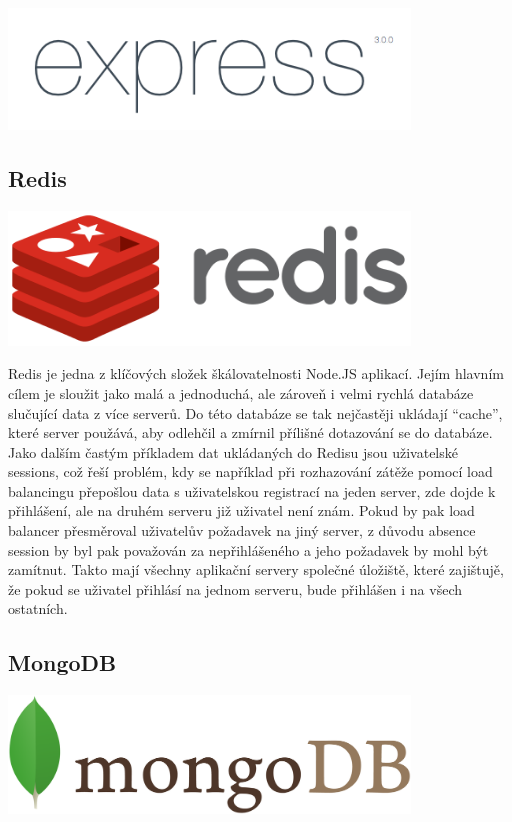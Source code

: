 \documentclass[thesis=M,czech]{FITthesis}[2012/06/26]
\begin{document}
\includegraphics[width=0.8\textwidth]{images/logo_express}


\subsection{Redis}

\includegraphics[width=0.8\textwidth]{images/logo_redis}

Redis je jedna z klíčových složek škálovatelnosti Node.JS aplikací. Jejím hlavním cílem je sloužit jako malá a jednoduchá, ale zároveň i velmi rychlá databáze slučující data z více serverů. Do této databáze se tak nejčastěji ukládají “cache”, které server použává, aby odlehčil a zmírnil přílišné dotazování se do databáze. Jako dalším častým příkladem dat ukládaných do Redisu jsou uživatelské sessions, což řeší problém, kdy se například při rozhazování zátěže pomocí load balancingu přepošlou data s uživatelskou registrací na jeden server, zde dojde k přihlášení, ale na druhém serveru již uživatel není znám. Pokud by pak load balancer přesměroval uživatelův požadavek na jiný server, z důvodu absence session by byl pak považován za nepřihlášeného a jeho požadavek by mohl být zamítnut. Takto mají všechny aplikační servery společné úložiště, které zajištujě, že pokud se uživatel přihlásí na jednom serveru, bude přihlášen i na všech ostatních.


\subsection{MongoDB}

\includegraphics[width=0.8\textwidth]{images/logo_mongodb}
\end{document}
